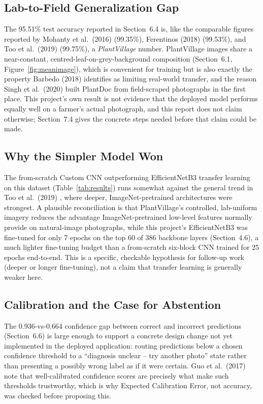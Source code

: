 \documentclass[12pt,a4paper]{article}
\begin{document}
\subsection{Lab-to-Field Generalization Gap}
The 95.51\% test accuracy reported in Section~6.4 is, like the comparable
figures reported by Mohanty et al.\ (2016) \cite{mohanty2016} (99.35\%),
Ferentinos (2018) \cite{ferentinos2018} (99.53\%), and Too et al.\ (2019)
\cite{too2019} (99.75\%), a \textit{PlantVillage} number. PlantVillage images
share a near-constant, centred-leaf-on-grey-background composition
(Section~6.1, Figure~\ref{fig:meanimage}), which is convenient for training
but is also exactly the property Barbedo (2018) \cite{barbedo2018} identifies
as limiting real-world transfer, and the reason Singh et al.\ (2020)
\cite{singh2020plantdoc} built PlantDoc from field-scraped photographs in the
first place. This project's own result is not evidence that the deployed
model performs equally well on a farmer's actual photograph, and this report
does not claim otherwise; Section~7.4 gives the concrete steps needed before
that claim could be made.

\subsection{Why the Simpler Model Won}
The from-scratch Custom CNN outperforming EfficientNetB3 transfer learning
on this dataset (Table~\ref{tab:results}) runs somewhat against the general
trend in Too et al.\ (2019) \cite{too2019}, where deeper, ImageNet-pretrained
architectures were strongest. A plausible reconciliation is that
PlantVillage's controlled, lab-uniform imagery reduces the advantage
ImageNet-pretrained low-level features normally provide on natural-image
photographs, while this project's EfficientNetB3 was fine-tuned for only 7
epochs on the top 60 of 386 backbone layers (Section~4.6), a much lighter
fine-tuning budget than a from-scratch six-block CNN trained for 25 epochs
end-to-end. This is a specific, checkable hypothesis for follow-up work
(deeper or longer fine-tuning), not a claim that transfer learning is
generally weaker here.

\subsection{Calibration and the Case for Abstention}
The 0.936-vs-0.664 confidence gap between correct and incorrect predictions
(Section~6.6) is large enough to support a concrete design change not yet
implemented in the deployed application: routing predictions below a chosen
confidence threshold to a ``diagnosis unclear -- try another photo'' state
rather than presenting a possibly wrong label as if it were certain. Guo
et al.\ (2017) \cite{guo2017calibration} note that well-calibrated confidence
scores are precisely what make such thresholds trustworthy, which is why
Expected Calibration Error, not accuracy, was checked before proposing this.
\end{document}
